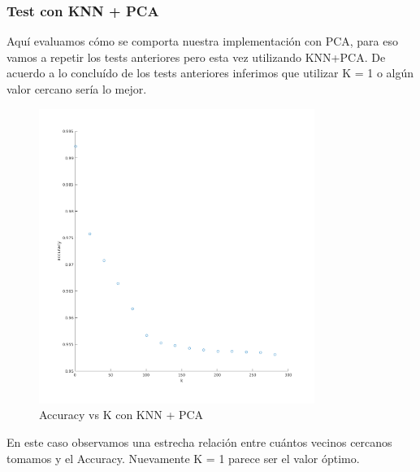 \subsubsection*{Test con KNN + PCA}
Aquí evaluamos cómo se comporta nuestra implementación con PCA, para eso vamos a repetir los tests anteriores pero esta vez utilizando KNN+PCA.
De acuerdo a lo concluído de los tests anteriores inferimos que utilizar K = 1 o algún valor cercano sería lo mejor. 



\begin{figure}[H]
	\centering
	\includegraphics[width=0.8\textwidth]{img/k_pca_accu.png}
	\caption{Accuracy vs K con KNN + PCA}
	\label{fig:K vs Accuracy con KNN + PCA}
\end{figure}

En este caso observamos una estrecha relación entre cuántos vecinos cercanos tomamos y el Accuracy.
Nuevamente K = 1 parece ser el valor óptimo.


